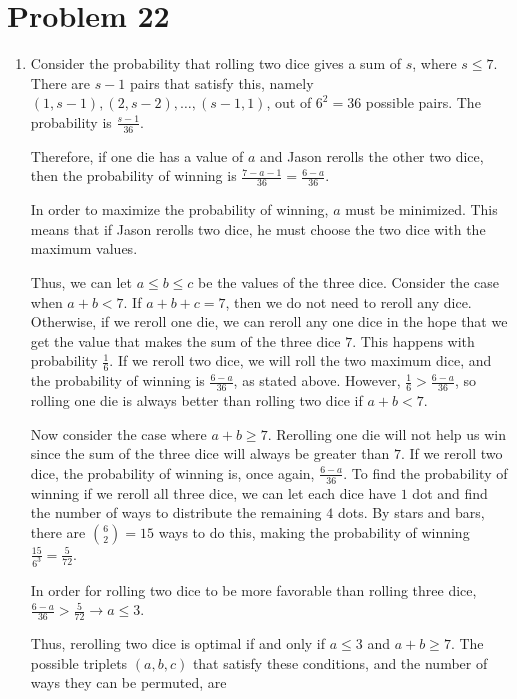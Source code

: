 \documentclass{article}%
\begin{document}
\section*{Problem 22}%
\label{sec:Problem22}%
\begin{enumerate}%
\item%
Consider the probability that rolling two dice gives a sum of $s$, where $s \leq 7$. There are $s - 1$ pairs that satisfy this, namely $(1, s - 1), (2, s - 2), \ldots, (s - 1, 1)$, out of $6^2 = 36$ possible pairs. The probability is $\frac{s - 1}{36}$.

Therefore, if one die has a value of $a$ and Jason rerolls the other two dice, then the probability of winning is $\frac{7 - a - 1}{36} = \frac{6 - a}{36}$.

In order to maximize the probability of winning, $a$ must be minimized. This means that if Jason rerolls two dice, he must choose the two dice with the maximum values.

Thus, we can let $a \leq b \leq c$ be the values of the three dice. Consider the case when $a + b < 7$. If $a + b + c = 7$, then we do not need to reroll any dice. Otherwise,
if we reroll one die, we can reroll any one dice in the hope that we get the value that makes the sum of the three dice $7$. This happens with probability $\frac16$. If we reroll two dice, we will roll the two maximum dice, and the probability of winning is $\frac{6 - a}{36}$, as stated above. However, $\frac16 > \frac{6 - a}{36}$, so rolling one die is always better than rolling two dice if $a + b < 7$.

Now consider the case where $a + b \geq 7$. Rerolling one die will not help us win since the sum of the three dice will always be greater than $7$. If we reroll two dice, the probability of winning is, once again, $\frac{6 - a}{36}$. To find the probability of winning if we reroll all three dice, we can let each dice have $1$ dot and find the number of ways to distribute the remaining $4$ dots. By stars and bars, there are ${6\choose2} = 15$ ways to do this, making the probability of winning $\frac{15}{6^3} = \frac5{72}$.

In order for rolling two dice to be more favorable than rolling three dice, $\frac{6 - a}{36} > \frac5{72} \rightarrow a \leq 3$.

Thus, rerolling two dice is optimal if and only if $a \leq 3$ and $a + b \geq 7$. The possible triplets $(a, b, c)$ that satisfy these conditions, and the number of ways they can be permuted, are


\end{enumerate}
\end{document}
